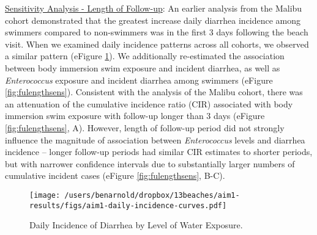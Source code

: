 \documentclass[12pt]{article}\usepackage[]{graphicx}\usepackage[]{color}
\begin{document}
\bigskip
\underline{Sensitivity Analysis - Length of Follow-up}: An earlier analysis from the Malibu cohort demonstrated that the greatest increase daily diarrhea incidence among swimmers compared to non-swimmers was in the first 3 days following the beach visit.\supercite{Arnold2013-xd} When we examined daily incidence patterns across all cohorts, we observed a similar pattern (eFigure \ref{fig:dailydiar}). We additionally re-estimated the association between body immersion swim exposure and incident diarrhea, as well as \emph{Enterococcus} exposure and incident diarrhea among swimmers (eFigure \ref{fig:fulengthsens}). Consistent with the analysis of the Malibu cohort,\supercite{Arnold2013-xd} there was an attenuation of the cumulative incidence ratio (CIR) associated with body immersion swim exposure with follow-up longer than 3 days (eFigure \ref{fig:fulengthsens}, A). However, length of follow-up period did not strongly influence the magnitude of association between \emph{Enterococcus} levels and diarrhea incidence -- longer follow-up periods had similar CIR estimates to shorter periods, but with narrower confidence intervals due to substantially larger numbers of cumulative incident cases (eFigure \ref{fig:fulengthsens}, B-C).

\begin{figure}[h!tb]
\begin{center}
\texttt{[image: /users/benarnold/dropbox/13beaches/aim1-results/figs/aim1-daily-incidence-curves.pdf]}
\caption{Daily Incidence of Diarrhea by Level of Water Exposure. \label{fig:dailydiar}}
\end{center}
\end{figure}
\end{document}
